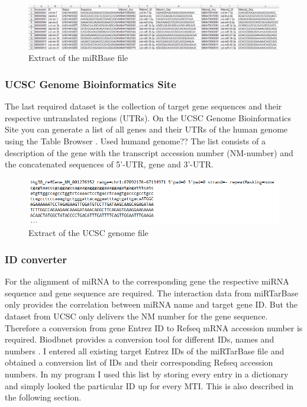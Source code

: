 \documentclass[12pt]{article}
\begin{document}
\begin{figure}[h]
\centering
\includegraphics[width=\textwidth]{results/mirbase.png}
\caption{Extract of the miRBase file}
\label{mirbase_scrot}
\end{figure}


\vspace{1cm}

 
\subsubsection{UCSC Genome Bioinformatics Site}
The last required dataset is the collection of target gene sequences and their respective untranslated regions (UTRs). On the UCSC Genome Bioinformatics Site you can generate a list of all genes and their UTRs of the human genome using the Table Browser \cite{ucsc}. Used humand genome??  The list consists of a description of the gene with the transcript accession number (NM-number) and the concatenated sequences of 5'-UTR, gene and 3'-UTR.\\


\begin{figure}[h]
\centering
\includegraphics[width=\textwidth]{results/ucsc.png}
\caption{Extract of the UCSC genome file}
\label{ucsc_scrot}
\end{figure}


\vspace{1cm}



\subsubsection{ID converter}
\label{sec:id}
For the alignment of miRNA to the corresponding gene the respective miRNA sequence and gene sequence are required. The interaction data from miRTarBase only provides the correlation between miRNA name and target gene ID. But the dataset from UCSC only delivers the NM number for the gene sequence. Therefore a conversion from gene Entrez ID to Refseq mRNA accession number is required. Biodbnet provides a conversion tool for different IDs, names and numbers \cite{biodb}. I entered all existing target Entrez IDs of the miRTarBase file and obtained a conversion list of IDs and their corresponding Refseq accession numbers. In my program I used this list by storing every entry in a dictionary and simply looked the particular ID up for every MTI. This is also described in the following section.
 
\end{document}
